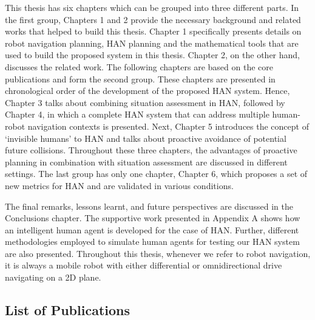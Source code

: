 This thesis has six chapters which can be grouped into three different parts. In the first group, Chapters 1 and 2 provide the necessary background and related works that helped to build this thesis. Chapter 1 specifically presents details on robot navigation planning, HAN planning and the mathematical tools that are used to build the proposed system in this thesis. Chapter 2, on the other hand, discusses the related work. The following chapters are based on the core publications and form the second group. These chapters are presented in chronological order of the development of the proposed HAN system. Hence, Chapter 3 talks about combining situation assessment in HAN, followed by Chapter 4, in which a complete HAN system that can address multiple human-robot navigation contexts is presented. Next, Chapter 5 introduces the concept of `invisible humans' to HAN and talks about proactive avoidance of potential future collisions. Throughout these three chapters, the advantages of proactive planning in combination with situation assessment are discussed in different settings. The last group has only one chapter, Chapter 6, which proposes a set of new metrics for HAN and are validated in various conditions.

The final remarks, lessons learnt, and future perspectives are discussed in the Conclusions chapter. The supportive work presented in Appendix A shows how an intelligent human agent is developed for the case of HAN. Further, different methodologies employed to simulate human agents for testing our HAN system are also presented. Throughout this thesis, whenever we refer to robot navigation, it is always a mobile robot with either differential or omnidirectional drive navigating on a 2D plane.

\subsection*{List of Publications}
